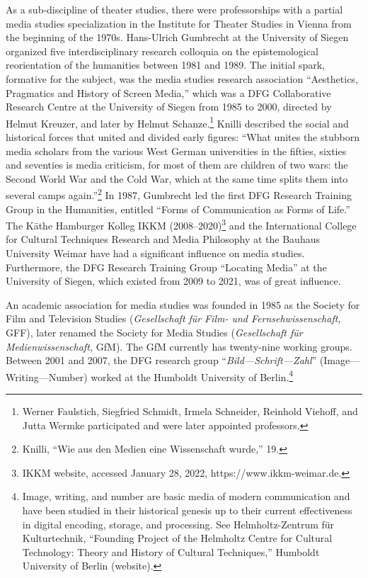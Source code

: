 \documentclass{tufte-handout}
\begin{document}
As a sub-discipline of theater studies, there were professorships with a
partial media studies specialization in the Institute for Theater
Studies in Vienna from the beginning of the 1970s. Hans-Ulrich Gumbrecht
at the University of Siegen organized five interdisciplinary research
colloquia on the epistemological reorientation of the humanities between
1981 and 1989. The initial spark, formative for the subject, was the
media studies research association ``Aesthetics, Pragmatics and History
of Screen Media,'' which was a DFG Collaborative Research Centre at the
University of Siegen from 1985 to 2000, directed by Helmut Kreuzer, and
later by Helmut Schanze.\footnote{Werner Faulstich, Siegfried Schmidt,
  Irmela Schneider, Reinhold Viehoff, and Jutta Wermke participated and
  were later appointed professors.} Knilli described the social and
historical forces that united and divided early figures: ``What unites
the stubborn media scholars from the various West German universities in
the fifties, sixties and seventies is media criticism, for most of them
are children of two wars: the Second World War and the Cold War, which
at the same time splits them into several camps again.''\footnote{Knilli,
  ``Wie aus den Medien eine Wissenschaft wurde,'' 19.} In 1987,
Gumbrecht led the first DFG Research Training Group in the Humanities,
entitled ``Forms of Communication as Forms of Life.'' The Käthe
Hamburger Kolleg IKKM (2008--2020)\footnote{IKKM website, accessed
  January 28, 2022, https://www.ikkm-weimar.de.} and the International
College for Cultural Techniques Research and Media Philosophy at the
Bauhaus University Weimar have had a significant influence on media
studies. Furthermore, the DFG Research Training Group ``Locating Media''
at the University of Siegen, which existed from 2009 to 2021, was of
great influence.

An academic association for media studies was founded in 1985 as the
Society for Film and Television Studies (\emph{Gesellschaft für}
\emph{Film- und Fernsehwissenschaft,} GFF), later renamed the Society
for Media Studies (\emph{Gesellschaft für Medienwissenschaft,} GfM). The
GfM currently has twenty-nine working groups. Between 2001 and 2007, the
DFG research group ``\emph{Bild---Schrift---Zahl}''
(Image---Writing---Number) worked at the Humboldt University of
Berlin.\footnote{Image, writing, and number are basic media of modern
  communication and have been studied in their historical genesis up to
  their current effectiveness in digital encoding, storage, and
  processing. See Helmholtz-Zentrum für Kulturtechnik, ``Founding
  Project of the Helmholtz Centre for Cultural Technology: Theory and
  History of Cultural Techniques,'' Humboldt University of Berlin
  (website).}
\end{document}
